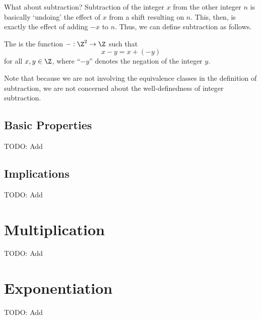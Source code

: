 What about subtraction? Subtraction of the integer $x$ from the other integer $n$ is basically `undoing' the effect of $x$ from a shift resulting on $n$. This, then, is exactly the effect of adding $-x$ to $n$. Thus, we can define subtraction as follows.
\begin{definition}
    The  is the function $-: \Z^2 \to \Z$ such that
    \[
        x - y = x + (-y)
    \]
    for all $x, y \in \Z$, where ``$-y$'' denotes the negation of the integer $y$.
\end{definition}
Note that because we are not involving the equivalence classes in the definition of subtraction, we are not concerned about the well-definedness of integer subtraction.

\subsection{Basic Properties}
TODO: Add

\subsection{Implications}
TODO: Add

\section{Multiplication}
TODO: Add

\section{Exponentiation}
TODO: Add
